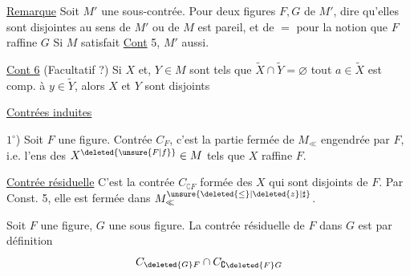 \uline{Remarque} Soit $M'$ une sous-contrée. Pour deux figures $F,G$ de $M'$,   dire qu'elles sont disjointes au sens de $M'$ ou de $M$ est pareil, et de $=$ pour la notion que $F$ raffine $G$ Si $M$ satisfait \uline{Cont} 5, $M'$ aussi. 

\uline{Cont 6} (Facultatif ?) Si $X$ et, $Y\in M$ sont tels que \deleted{$\forall$} $\widetilde X\cap\widetilde Y=\varnothing$  tout $a\in\widetilde X$ est comp. à  $y\in\widetilde Y$, alors $X$ et $Y$ sont disjoints

\uline{Contrées induites}

$1^\circ$) Soit $F$ une figure. Contrée  $C_F$,  c'est la partie fermée de $M_{\ll}$ engendrée par $F$, i.e. l'ens des $X^{\deleted{\unsure{F|f}}}\in M$ tels que $X$ raffine $F$.

\uline{Contrée résiduelle} C'est la  contrée $C_{\complement F}$  formée des $X$  qui sont disjoints de $F$. Par Const. 5, elle est   fermée dans $M^{\unsure{\deleted{\leq}|\deleted{z}|\sharp}}_{\ll}$.

 Soit $F$ une figure, $G$ une  sous figure. La contrée résiduelle de $F$ dans $G$ est par définition
\[
 C_{\deleted{G}F}\cap C_{\complement\deleted{F}G}
\]

